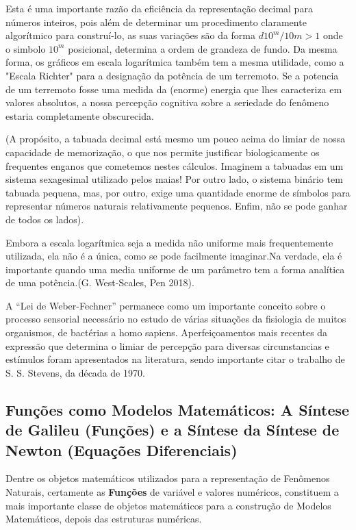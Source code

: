     Esta é uma importante razão da eficiência da representação decimal para números inteiros, pois além de determinar um procedimento claramente algorítmico para construí-lo, as suas variações são da forma \(d10^m/10m > 1\) onde o simbolo \(10^m\) posicional, determina a ordem de grandeza de fundo. Da mesma forma, os gráficos em escala logarítmica também tem a mesma utilidade, como a "Escala Richter" para a designação da potência de um terremoto. Se a potencia de um terremoto fosse uma medida da (enorme) energia que lhes caracteriza em valores absolutos, a nossa percepção cognitiva sobre a seriedade do fenômeno estaria completamente obscurecida.


    (A propósito, a tabuada decimal está mesmo um pouco acima do limiar de nossa capacidade de memorização, o que nos permite justificar biologicamente os frequentes enganos que cometemos nestes cálculos. Imaginem a tabuadas em um sistema sexagesimal utilizado pelos maias! Por outro lado, o sistema binário tem tabuada pequena, mas, por outro, exige uma quantidade enorme de símbolos para representar números naturais relativamente pequenos. Enfim, não se pode ganhar de todos os lados).

    Embora a escala logarítmica seja a medida não uniforme mais frequentemente utilizada, ela não é a única, como se pode facilmente imaginar.Na verdade, ela é importante quando uma media uniforme de um parâmetro tem a forma analítica de uma potência.(G. West-Scales, Pen 2018).

    A ``Lei de Weber-Fechner'' permanece como um importante conceito sobre o processo sensorial necessário no estudo de várias situações da fisiologia de muitos organismos, de bactérias a homo sapiens. Aperfeiçoamentos mais recentes da expressão que determina o limiar de percepção para diversas circunstancias e estímulos foram apresentados na literatura, sendo importante citar o trabalho de S. S. Stevens, da década de 1970.

\subsection{Funções como Modelos Matemáticos: A Síntese de Galileu (Funções) e a Síntese da Síntese de Newton (Equações Diferenciais)}

    Dentre os objetos matemáticos utilizados para a representação de Fenômenos Naturais, certamente as \textbf{Funções} de variável e valores numéricos, constituem a mais importante classe de objetos matemáticos para a construção de Modelos Matemáticos, depois das estruturas numéricas.

